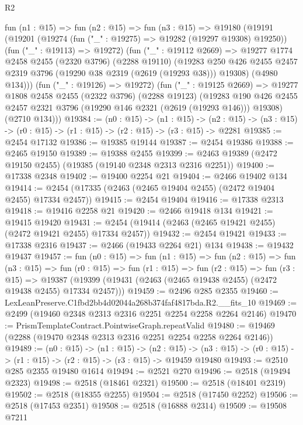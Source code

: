 \begin{lexlean}{R2}
\begin{coremodule}
  fun (n1 : @15) =>
  fun (n2 : @15) =>
  fun (n3 : @15) =>
  @19180
    (@19191
      (@19201
        (@19274 (fun ("_" : @19275) => @19282 (@19297 @19308) @19250))
        (fun ("_" : @19113) => @19272)
        (fun ("_" : @19112 @2669) =>
        @19277
          @1774
          @2458
          @2455
          (@2320 @3796)
          (@2288 @19110)
          (@19283 @250 @426 @2455 @2457 @2319 @3796 (@19290 @38 @2319 (@2619 (@19293 @38))) @19308)
          (@4980 @134)))
      (fun ("_" : @19126) => @19272)
      (fun ("_" : @19125 @2669) =>
      @19277
        @1808
        @2458
        @2455
        (@2322 @3796)
        (@2288 @19123)
        (@19283 @190 @426 @2455 @2457 @2321 @3796 (@19290 @146 @2321 (@2619 (@19293 @146))) @19308)
        (@2710 @134)))
@19384 := (n0 : @15) ->
  (n1 : @15) ->
  (n2 : @15) -> (n3 : @15) -> (r0 : @15) -> (r1 : @15) -> (r2 : @15) -> (r3 : @15) -> @2281
@19385 := @2454 @17132
@19386 := @19385 @19144
@19387 := @2454 @19386
@19388 := @2465 @19150
@19389 := @19388 @2455
@19399 := @2463 @19389 (@2472 @19150 @2455) (@19385 (@19140 @2348 @2313 @2316 @2251))
@19400 := @17338 @2348
@19402 := @19400 @2254 @21
@19404 := @2466 @19402 @134
@19414 := @2454 (@17335 (@2463 (@2465 @19404 @2455) (@2472 @19404 @2455) @17334 @2457))
@19415 := @2454 @19404
@19416 := @17338 @2313
@19418 := @19416 @2258 @21
@19420 := @2466 @19418 @134
@19421 := @19415 @19420
@19431 := @2454 (@19414 (@2463 (@2465 @19421 @2455) (@2472 @19421 @2455) @17334 @2457))
@19432 := @2454 @19421
@19433 := @17338 @2316
@19437 := @2466 (@19433 @2264 @21) @134
@19438 := @19432 @19437
@19457 := fun (n0 : @15) =>
  fun (n1 : @15) =>
  fun (n2 : @15) =>
  fun (n3 : @15) =>
  fun (r0 : @15) =>
  fun (r1 : @15) =>
  fun (r2 : @15) =>
  fun (r3 : @15) =>
  @19387 (@19399 (@19431 (@2463 (@2465 @19438 @2455) (@2472 @19438 @2455) @17334 @2457)))
@19459 := @2496 @285 @2355
@19460 := LexLeanPreserve.C1fbd2bb4d02044a268b374faf4817bda.R2.__fits_10
@19469 := @2499 (@19460 @2348 @2313 @2316 @2251 @2254 @2258 @2264 @2146)
@19470 := PrismTemplateContract.PointwiseGraph.repeatValid
@19480 := @19469 (@2288 (@19470 @2348 @2313 @2316 @2251 @2254 @2258 @2264 @2146))
@19489 := (n0 : @15) ->
  (n1 : @15) ->
  (n2 : @15) -> (n3 : @15) -> (r0 : @15) -> (r1 : @15) -> (r2 : @15) -> (r3 : @15) -> @19459 @19480
@19493 := @2510 @285 @2355 @19480 @1614
@19494 := @2521 @270
@19496 := @2518 (@19494 @2323)
@19498 := @2518 (@18461 @2321)
@19500 := @2518 (@18401 @2319)
@19502 := @2518 (@18355 @2255)
@19504 := @2518 (@17450 @2252)
@19506 := @2518 (@17453 @2351)
@19508 := @2518 (@16888 @2314)
@19509 := @19508 @7211

\end{coremodule}
\end{lexlean}
